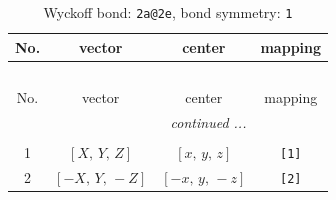 \documentclass[fleqn,8pt]{jsarticle}
\begin{document}
\begin{longtable}{cccc}
\caption{Wyckoff bond: {\tt 2a@2e}, bond symmetry: {\tt 1}}
 \\
 \hline \hline
No. & vector & center & mapping \\ \hline \endfirsthead

\multicolumn{3}{l}{\tablename\ \thetable{}} \\
 \hline \hline
No. & vector & center & mapping \\ \hline \endhead

 \hline \hline
\multicolumn{3}{r}{\footnotesize\it continued ...} \\ \endfoot

 \hline \hline
\multicolumn{3}{r}{} \\ \endlastfoot

1 & $\left[ X,\, Y,\, Z \right]$ & $\left[ x,\, y,\, z \right]$ & {\tt [1]} \\ \hline
2 & $\left[ - X,\, Y,\, - Z \right]$ & $\left[ - x,\, y,\, - z \right]$ & {\tt [2]} \\
\end{longtable}
\end{document}
